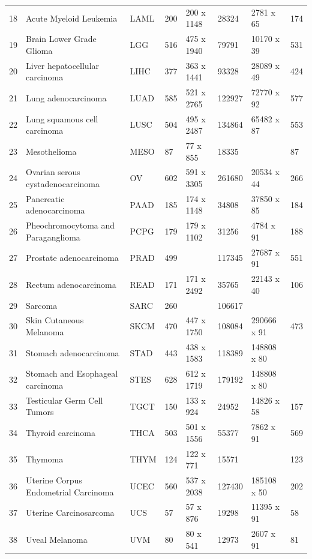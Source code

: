 \begin{widetable}[h]
\begin{tabular}{rlllllll}
  18 & Acute Myeloid Leukemia & LAML & 200 & 200 x 1148 & 28324  & 2781 x 65 &   174 \\ 
  19 & Brain Lower Grade Glioma & LGG & 516 & 475 x 1940 & 79791  & 10170 x 39 &   531 \\ 
  20 & Liver hepatocellular carcinoma & LIHC & 377 & 363 x 1441 & 93328  & 28089 x 49 &   424 \\ 
  21 & Lung adenocarcinoma & LUAD & 585 & 521 x 2765 & 122927  & 72770 x 92 &   577 \\ 
  22 & Lung squamous cell carcinoma & LUSC & 504 & 495 x 2487 & 134864  & 65482 x 87 &   553 \\ 
  23 & Mesothelioma & MESO & 87 & 77 x 855 & 18335  &  &   87 \\ 
  24 & Ovarian serous cystadenocarcinoma & OV & 602 & 591 x 3305 & 261680  & 20534 x 44 &   266 \\ 
  25 & Pancreatic adenocarcinoma & PAAD & 185 & 174 x 1148 & 34808  & 37850 x 85 &   184 \\ 
  26 & Pheochromocytoma and Paraganglioma & PCPG & 179 & 179 x 1102 & 31256  & 4784 x 91 &   188 \\ 
  27 & Prostate adenocarcinoma & PRAD & 499 &  & 117345  & 27687 x 91 &   551 \\ 
  28 & Rectum adenocarcinoma & READ & 171 & 171 x 2492 & 35765  & 22143 x 40 &   106 \\ 
  29 & Sarcoma & SARC & 260 &  & 106617  &  &  \\ 
  30 & Skin Cutaneous Melanoma & SKCM & 470 & 447 x 1750 & 108084  & 290666 x 91 &   473 \\ 
  31 & Stomach adenocarcinoma & STAD & 443 & 438 x 1583 & 118389  & 148808 x 80 &  \\ 
  32 & Stomach and Esophageal carcinoma & STES & 628 & 612 x 1719 & 179192  & 148808 x 80 &  \\ 
  33 & Testicular Germ Cell Tumors & TGCT & 150 & 133 x 924 & 24952  & 14826 x 58 &   157 \\ 
  34 & Thyroid carcinoma & THCA & 503 & 501 x 1556 & 55377  & 7862 x 91 &   569 \\ 
  35 & Thymoma & THYM & 124 & 122 x 771 & 15571  &  &   123 \\ 
  36 & Uterine Corpus Endometrial Carcinoma & UCEC & 560 & 537 x 2038 & 127430  & 185108 x 50 &   202 \\ 
  37 & Uterine Carcinosarcoma & UCS & 57 & 57 x 876 & 19298  & 11395 x 91 &   58 \\ 
  38 & Uveal Melanoma & UVM & 80 & 80 x 541 & 12973  & 2607 x 91 &   81 \\ 
   \bottomrule
\end{tabular}
\end{widetable}

